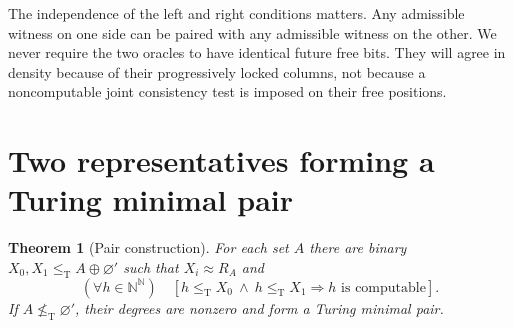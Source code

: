 \documentclass[11pt,a4paper]{article}
\newcommand{\N}{\mathbb N}
\newcommand{\Baire}{\N^{\N}}
\newcommand{\leT}{\leq_{\mathrm T}}
\newcommand{\nleT}{\nleq_{\mathrm T}}
\newtheorem{theorem}{Theorem}[section]
\theoremstyle{definition}\newtheorem{definition}[theorem]{Definition}
\theoremstyle{remark}\newtheorem{remark}[theorem]{Remark}
\begin{document}
The independence of the left and right conditions matters. Any admissible witness on one side can be paired with any admissible witness on the other. We never require the two oracles to have identical future free bits. They will agree in density because of their progressively locked columns, not because a noncomputable joint consistency test is imposed on their free positions.

\section{Two representatives forming a Turing minimal pair}
\label{sec:pair}
\begin{theorem}[Pair construction]\label{thm:pair}
For each set $A$ there are binary $X_0,X_1\leT A\oplus\varnothing'$ such that $X_i\approx R_A$ and
\begin{equation}\label{eq:common}
 (\forall h\in\Baire)\quad
 [h\leT X_0\ \land\ h\leT X_1\Rightarrow h\text{ is computable}].
\end{equation}
If $A\nleT\varnothing'$, their degrees are nonzero and form a Turing minimal pair.
\end{theorem}
\end{document}
